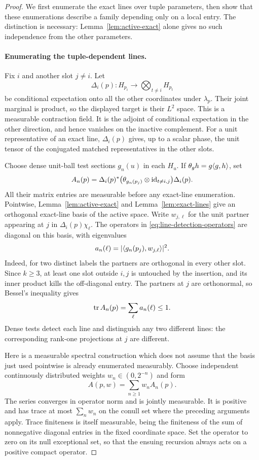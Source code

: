 \begin{proof}
We first enumerate the exact lines over tuple parameters, then show
that these enumerations describe a family depending only on a local
entry. The distinction is necessary: Lemma~\ref{lem:active-exact}
alone gives no such independence from the other parameters.

\paragraph{Enumerating the tuple-dependent lines.}
Fix $i$ and another slot $j\ne i$. Let
\[
 \Delta_i(p):H_{p_i}\longrightarrow
       \bigotimes_{t\ne i}H_{p_t}
\]
be conditional expectation onto all the other coordinates under
$\lambda_p$. Their joint marginal is product, so the displayed target
is their $L^2$ space. This is a measurable contraction field. It is the
adjoint of conditional expectation in the other direction, and hence
vanishes on the inactive complement. For a unit representative of an
exact line, $\Delta_i(p)$ gives, up to a scalar phase, the unit tensor
of the conjugated matched representatives in the other slots.

Choose dense unit-ball test sections $g_n(u)$ in each $H_u$. If
$\theta_g h=g\langle g,h\rangle$, set
\begin{equation}\label{eq:line-detection-operators}
 A_n(p)=\Delta_i(p)^*
   \bigl(\theta_{g_n(p_j)}\otimes\operatorname{id}_{t\ne i,j}\bigr)
   \Delta_i(p).
\end{equation}
All their matrix entries are measurable before any exact-line
enumeration. Pointwise, Lemma~\ref{lem:active-exact} and
Lemma~\ref{lem:exact-lines} give an orthogonal exact-line basis of the
active space. Write $w_{j,\ell}$ for the unit partner appearing at $j$
in $\Delta_i(p)\chi_\ell$. The operators in
\eqref{eq:line-detection-operators} are diagonal on this basis, with
eigenvalues
\[
 a_n(\ell)=\lvert \langle g_n(p_j),w_{j,\ell}\rangle\rvert^2.
\]
Indeed, for two distinct labels the partners are orthogonal in every
other slot. Since $k\ge3$, at least one slot outside $i,j$ is untouched
by the insertion, and its inner product kills the off-diagonal entry.
The partners at $j$ are orthonormal, so Bessel's inequality gives
\begin{equation}\label{eq:line-operator-trace}
 \operatorname{tr} A_n(p)=\sum_\ell a_n(\ell)\le1.
\end{equation}
Dense tests detect each line and distinguish any two different lines:
the corresponding rank-one projections at $j$ are different.

Here is a measurable spectral construction which does not assume
that the basis just used pointwise is already enumerated measurably.
Choose independent continuously distributed weights
$w_n\in(0,2^{-n})$ and form
\[
 A(p,w)=\sum_{n\ge1}w_n A_n(p).
\]
The series converges in operator norm and is jointly measurable.
It is positive and has trace at most $\sum_n w_n$ on the conull set
where the preceding arguments apply. Trace finiteness is itself
measurable, being the finiteness of the sum of nonnegative diagonal
entries in the fixed coordinate space. Set the operator to zero on
its null exceptional set, so that the ensuing recursion always acts
on a positive compact operator.


\end{proof}
